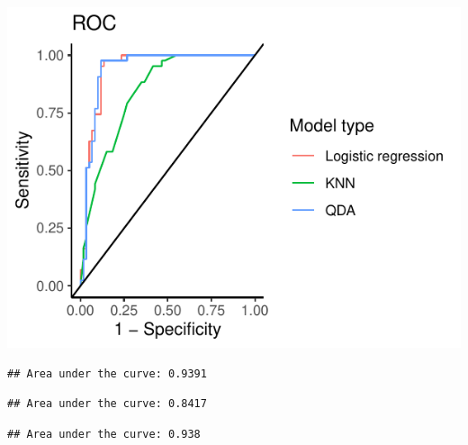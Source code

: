 \documentclass[
]{article}
\newenvironment{Shaded}{\begin{snugshade}}{\end{snugshade}}
\newcommand{\CommentTok}[1]{\textcolor[rgb]{0.56,0.35,0.01}{\textit{#1}}}
\newcommand{\NormalTok}[1]{#1}
\newcommand{\SpecialCharTok}[1]{\textcolor[rgb]{0.00,0.00,0.00}{#1}}
\begin{document}
\begin{center}\includegraphics{hand-in_files/figure-latex/unnamed-chunk-9-1} \end{center}

\begin{Shaded}
\end{Shaded}

\begin{verbatim}
## Area under the curve: 0.9391
\end{verbatim}

\begin{Shaded}
\end{Shaded}

\begin{verbatim}
## Area under the curve: 0.8417
\end{verbatim}

\begin{Shaded}
\end{Shaded}

\begin{verbatim}
## Area under the curve: 0.938
\end{verbatim}
\end{document}
